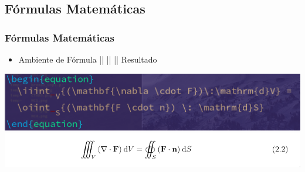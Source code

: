 \documentclass{beamer}
\begin{document}
	\begin{frame}
	  \section{Fórmulas Matemáticas}
	  \frametitle{Fórmulas Matemáticas}

	   \begin{itemize}
	  \item Ambiente de Fórmula || || || Resultado
	  \end{itemize}
	 \begin{center}
	   \includegraphics[scale=0.30]{../Imagens/A2I71.png}
	   \includegraphics[scale=0.40]{../Imagens/A2I72.png}
	\end{center}
	\end{frame}



\end{document}

